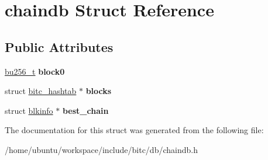 \hypertarget{structchaindb}{\section{chaindb Struct Reference}
\label{structchaindb}
}
\subsection*{Public Attributes}
\begin{DoxyCompactItemize}
\item 
\hypertarget{structchaindb_a538ccd0465b52d4b7503c035c22b77ea}{\hyperlink{structbu256}{bu256\-\_\-t} {\bfseries block0}}\label{structchaindb_a538ccd0465b52d4b7503c035c22b77ea}

\item 
\hypertarget{structchaindb_ab7fad0b1dd819c4bb0b2948aba68bcbe}{struct \hyperlink{structbitc__hashtab}{bitc\-\_\-hashtab} $\ast$ {\bfseries blocks}}\label{structchaindb_ab7fad0b1dd819c4bb0b2948aba68bcbe}

\item 
\hypertarget{structchaindb_aa3e235eafff227b86331a8d264ef0b8a}{struct \hyperlink{structblkinfo}{blkinfo} $\ast$ {\bfseries best\-\_\-chain}}\label{structchaindb_aa3e235eafff227b86331a8d264ef0b8a}

\end{DoxyCompactItemize}


The documentation for this struct was generated from the following file\-:\begin{DoxyCompactItemize}
\item 
/home/ubuntu/workspace/include/bitc/db/chaindb.\-h\end{DoxyCompactItemize}
